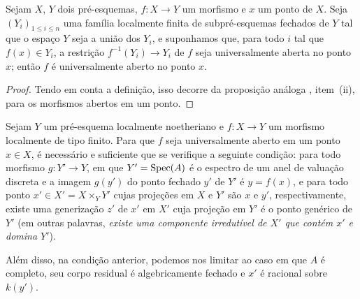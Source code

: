 \begin{proposition}[14.3.5]
\label{IV.14.3.5}
Sejam $X$, $Y$ dois pré-esquemas, $f:X\to Y$ um morfismo e $x$ um ponto de $X$.
Seja $(Y_i)_{1\leq i\leq n}$ uma família localmente finita de subpré-esquemas fechados de $Y$ tal que o espaço $Y$ seja a união dos $Y_i$, e suponhamos que, para todo $i$ tal que $f(x)\in Y_i$, a restrição $f^{-1}(Y_i)\to Y_i$ de $f$ seja universalmente aberta no ponto $x$; então $f$ é universalmente aberto no ponto $x$.
\end{proposition}

\begin{proof}
Tendo em conta a definição, isso decorre da proposição análoga , item~(ii), para os morfismos abertos em um ponto.
\end{proof}

\begin{proposition}[14.3.6]
\label{IV.14.3.6}
Sejam $Y$ um pré-esquema localmente noetheriano e $f:X\to Y$ um morfismo localmente de tipo finito.
Para que $f$ seja universalmente aberto em um ponto $x\in X$, é necessário e suficiente que se verifique a seguinte condição: para todo morfismo $g:Y'\to Y$, em que $Y'=\operatorname{Spec}(A)$ é o espectro de um anel de valuação discreta e a imagem $g(y')$ do ponto fechado $y'$ de $Y'$ é $y=f(x)$, e para todo ponto $x'\in X'=X\times_Y Y'$ cujas projeções em $X$ e $Y'$ são $x$ e $y'$, respectivamente, existe uma generização $z'$ de $x'$ em $X'$ cuja projeção em $Y'$ é o ponto genérico de $Y'$ (em outras palavras, \emph{existe uma componente irredutível de $X'$ que contém $x'$ e domina $Y'$}).


Além disso, na condição anterior, podemos nos limitar ao caso em que $A$ é completo, seu corpo residual é algebricamente fechado e $x'$ é racional sobre $k(y')$.
\end{proposition}

